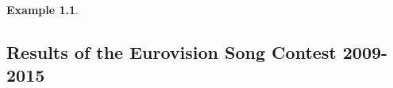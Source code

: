 \documentclass[a4paper,11pt]{report}
\newtheorem{example}[theorem]{Example}
\begin{document}
\begin{example}
\begin{appendices}





\begin{landscape}
  \chapter{Results of the Eurovision Song Contest 2009-2015}
  

\end{landscape}
\end{appendices}
\end{example}
\end{document}
